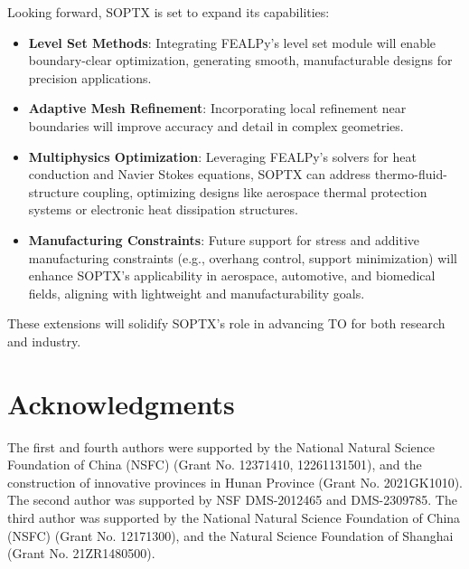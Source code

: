 \documentclass[mathpazo]{cicp}
\begin{document}
Looking forward, SOPTX is set to expand its capabilities:
\vspace{-0.5ex} %
\begin{itemize} 
	\item \textbf{Level Set Methods}: Integrating FEALPy's level set module will enable boundary-clear optimization, generating smooth, manufacturable designs for precision applications.
	\item \textbf{Adaptive Mesh Refinement}: Incorporating local refinement near boundaries will improve accuracy and detail in complex geometries.
	\item \textbf{Multiphysics Optimization}: Leveraging FEALPy's solvers for heat conduction and Navier Stokes equations, SOPTX can address thermo-fluid-structure coupling, optimizing designs like aerospace thermal protection systems or electronic heat dissipation structures.
	\item \textbf{Manufacturing Constraints}: Future support for stress and additive manufacturing constraints (e.g., overhang control, support minimization) will enhance SOPTX's applicability in aerospace, automotive, and biomedical fields, aligning with lightweight and manufacturability goals.
\end{itemize}
\vspace{-0.5ex} %
These extensions will solidify SOPTX's role in advancing TO for both research and industry.

\section*{Acknowledgments}
The first and fourth authors were supported by the National Natural Science
Foundation of China (NSFC) (Grant No. 12371410, 12261131501), and the
construction of innovative provinces in Hunan Province (Grant No. 2021GK1010).
The second author was supported by NSF DMS-2012465 and DMS-2309785. The third
author was supported by the National Natural Science Foundation of China (NSFC)
(Grant No. 12171300), and the Natural Science Foundation of Shanghai (Grant No.
21ZR1480500).

\appendix
\renewcommand{\thesection}{Appendix\,\Alph{section}}
\end{document}
